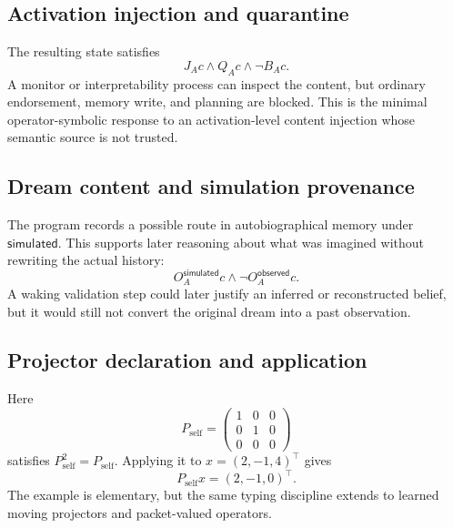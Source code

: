 \subsection{Activation injection and quarantine}



The resulting state satisfies
\[
J_Ac\wedge Q_Ac\wedge\neg B_Ac.
\]
A monitor or interpretability process can inspect the content, but ordinary
endorsement, memory write, and planning are blocked.  This is the minimal
operator-symbolic response to an activation-level content injection whose
semantic source is not trusted.

\subsection{Dream content and simulation provenance}



The program records a possible route in autobiographical memory under
\(\mathsf{simulated}\).  This supports later reasoning about what was imagined
without rewriting the actual history:
\[
O_A^{\mathsf{simulated}}c
\wedge
\neg O_A^{\mathsf{observed}}c.
\]
A waking validation step could later justify an inferred or reconstructed
belief, but it would still not convert the original dream into a past
observation.

\subsection{Projector declaration and application}



Here
\[
P_{\mathrm{self}}
=
\begin{pmatrix}
1&0&0\\
0&1&0\\
0&0&0
\end{pmatrix}
\]
satisfies \(P_{\mathrm{self}}^2=P_{\mathrm{self}}\).  Applying it to
\(x=(2,-1,4)^\top\) gives
\[
P_{\mathrm{self}}x=(2,-1,0)^\top.
\]
The example is elementary, but the same typing discipline extends to learned
moving projectors and packet-valued operators.


